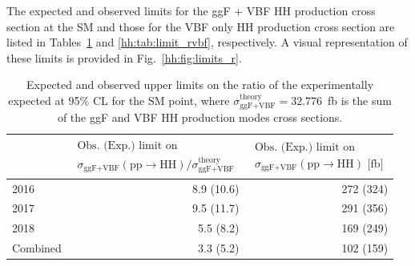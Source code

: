 \documentclass[../main.tex]{subfiles}
\begin{document}
The expected and observed limits for the ggF + VBF HH production cross section at the SM and those for the VBF only HH production cross section are listed in Tables~\ref{hh:tab:limit_r} and \ref{hh:tab:limit_rvbf}, respectively. A visual representation of these limits is provided in Fig.~\ref{hh:fig:limits_r}.

\begin{table}[h!]
\begin{center}
\begin{tabular}{l | r | r}
& 
$
\begin{matrix}
\text{Obs. (Exp.) limit on } \\ \sigma_{\text{ggF+VBF}}(\text{pp}\to\text{HH})/ \sigma_{\text{ggF+VBF}}^{\text{theory}} 
\end{matrix}
$
& 
$
\begin{matrix}
\text{Obs. (Exp.) limit on } \\ \sigma_{\text{ggF+VBF}}(\text{pp}\to\text{HH}) \text{~[fb]}
\end{matrix}
$ \\ \hline
2016 &     8.9 (10.6) & 272 (324) \\
2017 &     9.5 (11.7) & 291 (356) \\
2018 &     5.5 (8.2)  & 169 (249) \\
Combined & 3.3 (5.2)  & 102 (159)
\end{tabular}
\end{center}
\caption[Upper limits on the HH inclusive production cross section]{Expected and observed upper limits on the ratio of the experimentally expected at 95\% CL for the SM point, where $\sigma_{\text{ggF+VBF}}^{\text{theory}}=32.776$~fb is the sum of the ggF and VBF HH production modes cross sections.}
\label{hh:tab:limit_r}
\end{table}
\end{document}
